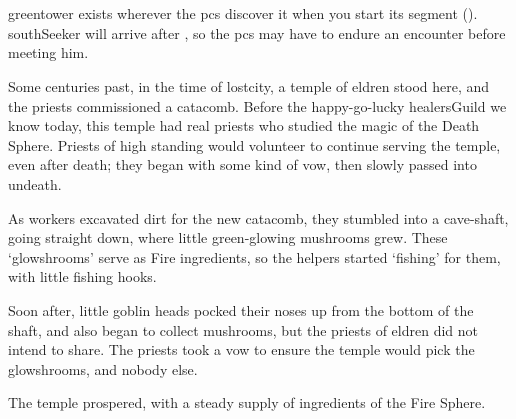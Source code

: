 \section{}
\label{green_tower}

\begin{multicols}{2}

\noindent
\Gls{greentower} exists wherever the \glspl{pc} discover it when you start its \gls{segment} ().
\Gls{southSeeker} will arrive after , so the \glspl{pc} may have to endure an encounter before meeting him.



\begin{exampletext}
  Some centuries past, in the time of \gls{lostcity}, a temple of \gls{eldren} stood here, and the priests commissioned a catacomb.
  Before the happy-go-lucky \gls{healersGuild} we know today, this temple had real priests who studied the magic of the Death Sphere.
  Priests of high standing would volunteer to continue serving the temple, even after death; they began with some kind of vow, then slowly passed into undeath.

  As workers excavated dirt for the new catacomb, they stumbled into a cave-shaft, going straight down, where little green-glowing mushrooms grew.
  These `\glspl{glowshroom}' serve as Fire \glspl{ingredient}, so the \glspl{helper} started `fishing' for them, with little fishing hooks.

  Soon after, little goblin heads pocked their noses up from the bottom of the shaft, and also began to collect mushrooms, but the priests of \gls{eldren} did not intend to share.
  The priests took a vow to ensure the temple would pick the \glspl{glowshroom}, and nobody else.

  The temple prospered, with a steady supply of \glspl{ingredient} of the Fire Sphere.
\end{exampletext}


\end{multicols}
